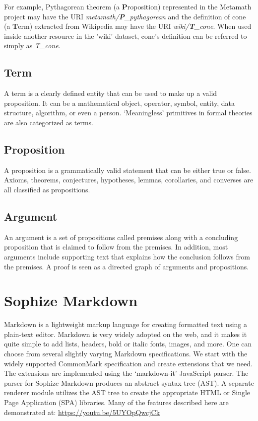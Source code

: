 \documentclass[a4paper]{article}
\begin{document}
For example, Pythagorean theorem (a \textbf{P}roposition) represented in the Metamath project may have the URI \emph{metamath/\textbf{P}\_pythagorean} and the definition of cone (a \textbf{T}erm) extracted from Wikipedia may have the URI \emph{wiki/\textbf{T}\_cone}. When used inside another resource in the 'wiki' dataset, cone's definition can be referred to simply as \emph{T\_cone}.

\subsection*{Term}

A term is a clearly defined entity that can be used to make up a valid proposition. It can be a mathematical object, operator, symbol, entity, data structure, algorithm, or even a person. `Meaningless' primitives in formal theories are also categorized as terms.

\subsection*{Proposition}

A proposition is a grammatically valid statement that can be either true or false. Axioms, theorems, conjectures, hypotheses, lemmas, corollaries, and converses are all classified as propositions.

\subsection*{Argument}

An argument is a set of propositions called premises along with a concluding proposition that is claimed to follow from the premises. In addition, most arguments include supporting text that explains how the conclusion follows from the premises. A proof is seen as a directed graph of arguments and propositions.

\section{Sophize Markdown}

Markdown is a lightweight markup language for creating formatted text using a plain-text editor. Markdown is very widely adopted on the web, and it makes it quite simple to add lists, headers, bold or italic fonts, images, and more. One can choose from several slightly varying Markdown specifications. We start with the widely supported CommonMark specification and create extensions that we need. The extensions are implemented using the `markdown-it' \cite{markdown_it} JavaScript parser. The parser for Sophize Markdown produces an abstract syntax tree (AST). A separate renderer module utilizes the AST tree to create the appropriate HTML or Single Page Application (SPA) libraries. Many of the features described here are demonstrated at: \url{https://youtu.be/5UYOpQwcjCk}
\end{document}
